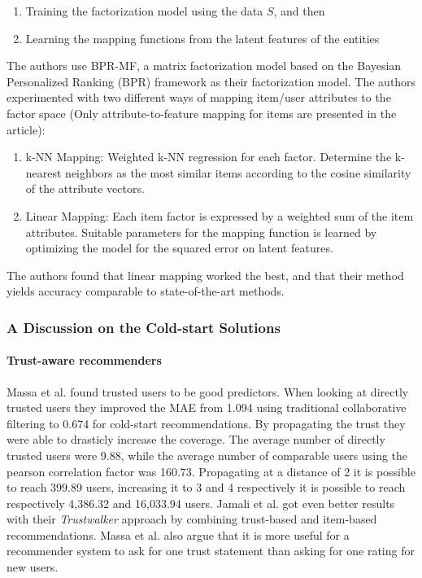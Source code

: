 \begin{enumerate}
\item Training the factorization model using the data $S$, and then
\item Learning the mapping functions from the latent features of the entities
\end{enumerate}

The authors use BPR-MF, a matrix factorization model based on the Bayesian
Personalized Ranking (BPR) framework as their factorization model. The authors
experimented with two different ways of mapping item/user attributes to the
factor space (Only attribute-to-feature mapping for items are presented in the
article):

\begin{enumerate}
\item k-NN Mapping:	Weighted k-NN regression for each factor. Determine the
k-nearest neighbors as the most similar items according to the cosine
similarity of the attribute vectors.
\item Linear Mapping: Each item factor is expressed by a weighted sum of the
item attributes. Suitable parameters for the mapping function is learned by
optimizing the model for the squared error on latent features.
\end{enumerate}

The authors found that linear mapping worked the best, and that their method
yields accuracy comparable to state-of-the-art methods.

\subsubsection{A Discussion on the Cold-start Solutions}

\paragraph{Trust-aware recommenders}

Massa et al. \cite{Massa2007} found trusted users to be good predictors. When
looking at directly trusted users they improved the MAE from 1.094 using
traditional collaborative filtering to 0.674 for cold-start recommendations. By
propagating the trust they were able to drasticly increase the coverage. The
average number of directly trusted users were 9.88, while the average number of
comparable users using the pearson correlation factor was 160.73. Propagating
at a distance of 2 it is possible to reach 399.89 users, increasing it to 3 and
4 respectively it is possible to reach respectively 4,386.32 and 16,033.94
users. Jamali et al. \cite{Jamali2009} got even better results with their
\emph{Trustwalker} approach by combining trust-based and item-based
recommendations. Massa et al. \cite{Massa2004} also argue that it is more
useful for a recommender system to ask for one trust statement than asking for
one rating for new users.


